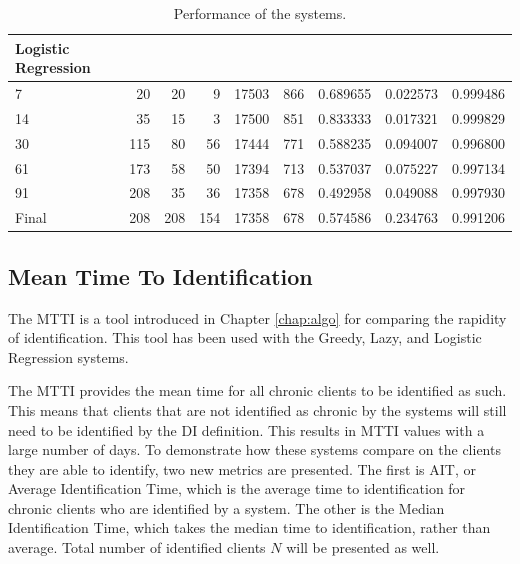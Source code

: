 \begin{table}[h]
\begin{tabular}{lrrrrrrrr}
	\bottomrule
	\toprule
	Logistic Regression & & & & & & & & \\
	\midrule
	7     &   20 &   20 &    9 &  17503 &  866 &    0.689655 &     0.022573 &     0.999486 \\
	14    &   35 &   15 &    3 &  17500 &  851 &    0.833333 &     0.017321 &     0.999829 \\
	30    &  115 &   80 &   56 &  17444 &  771 &    0.588235 &     0.094007 &     0.996800 \\
	61    &  173 &   58 &   50 &  17394 &  713 &    0.537037 &     0.075227 &     0.997134 \\
	91    &  208 &   35 &   36 &  17358 &  678 &    0.492958 &     0.049088 &     0.997930 \\
	Final &  208 &  208 &  154 &  17358 &  678 &    0.574586 &     0.234763 &     0.991206 \\
	\bottomrule
	\end{tabular}

	\caption{Performance of the \Abb systems.}
	\label{tbl:results:abb}
\end{table}


\subsection{Mean Time To Identification}

The MTTI is a tool introduced in Chapter \ref{chap:algo} for comparing the rapidity of identification. This tool has been used with the Greedy, Lazy, and Logistic Regression systems.


The MTTI provides the mean time for all chronic clients to be identified as such. This means that clients that are not identified as chronic by the \Abb systems will still need to be identified by the DI definition. This results in MTTI values with a large number of days. To demonstrate how these systems compare on the clients they are able to identify, two new metrics are presented. The first is AIT, or Average Identification Time, which is the average time to identification for chronic clients who are identified by a system. The other is the Median Identification Time, which takes the median time to identification, rather than average. Total number of identified clients $N$ will be presented as well.

